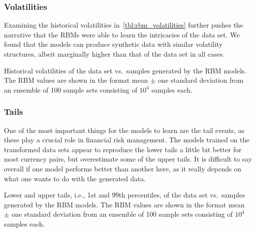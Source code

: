 \subsubsection{Volatilities}
Examining the historical volatilities in~\cref{tbl:rbm_volatilities} further pushes the narrative that the RBMs were able to learn the intricacies of the data set.
We found that the models can produce synthetic data with similar volatility structures, albeit marginally higher than that of the data set in all cases.
\begin{table}[!htb]
    \centering
    \begin{adjustbox}{max width=\textwidth}
        
    \end{adjustbox}
    \caption{Historical volatilities of the data set vs.~samples generated by the RBM models. The RBM values are shown in the format mean \(\pm\) one standard deviation from an ensemble of 100 sample sets consisting of \( 10^4 \) samples each.}
    \label{tbl:rbm_volatilities}
\end{table}

\subsubsection{Tails}
One of the most important things for the models to learn are the tail events, as these play a crucial role in financial risk management.
The models trained on the transformed data sets appear to reproduce the lower tails a little bit better for most currency pairs, but overestimate some of the upper tails.
It is difficult to say overall if one model performs better than another here, as it really depends on what one wants to do with the generated data.
\begin{table}[!htb]
    \centering
    \begin{adjustbox}{max width=\textwidth}
        
    \end{adjustbox}
    \caption{Lower and upper tails, i.e., 1st and 99th percentiles, of the data set vs.~samples generated by the RBM models. The RBM values are shown in the format mean \(\pm\) one standard deviation from an ensemble of 100 sample sets consisting of \( 10^4 \) samples each.}
    \label{tbl:rbm_tails}
\end{table}

